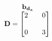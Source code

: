 \documentclass[preview]{standalone}
\begin{document}
\begin{align*}
\begin{array}{c}\begin{matrix}\hspace{1cm} \mathbf{b_{d_x}}  \quad \hspace{0.6cm} \end{matrix} \\  \mathbf{D} = \begin{bmatrix} 2 & \quad 0 \\ \\0 & \quad 3 \end{bmatrix} \end{array}
\end{align*}
\end{document}
